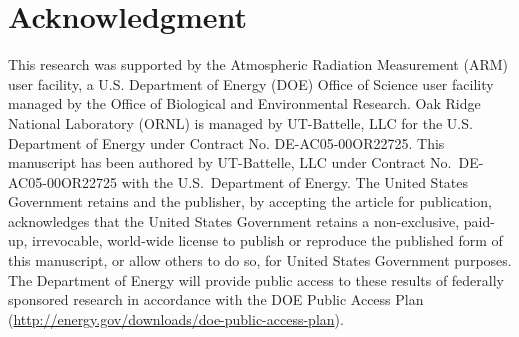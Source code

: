 \documentclass[conference]{IEEEtran}
\begin{document}
\section*{Acknowledgment}
This research was supported by the Atmospheric Radiation Measurement (ARM) user 
facility, a U.S. Department of Energy (DOE) Office of Science user facility 
managed by the Office of Biological and Environmental Research.
Oak Ridge National Laboratory (ORNL) is managed by UT-Battelle, LLC 
for the U.S. Department of Energy under Contract No. DE-AC05-00OR22725.
This manuscript has been authored by UT-Battelle, LLC under Contract No.\
DE-AC05-00OR22725 with the U.S.\ Department of Energy.  The United States
Government retains and the publisher, by accepting the article for
publication, acknowledges that the United States Government retains a
non-exclusive, paid-up, irrevocable, world-wide license to publish or
reproduce the published form of this manuscript, or allow others to do
so, for United States Government purposes.  The Department of Energy
will provide public access to these results of federally sponsored
research in accordance with the DOE Public Access
Plan (\url{http://energy.gov/downloads/doe-public-access-plan}).

 

\end{document}
